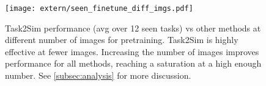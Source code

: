 \begin{figure}[]
    \centering
    \centering
    \texttt{[image: extern/seen\_finetune\_diff\_imgs.pdf]}
    \vspace{-4mm}
    \caption{Task2Sim performance (avg over 12 seen tasks) vs other methods at different number of images for pretraining. Task2Sim is highly effective at fewer images. Increasing the number of images improves performance for all methods, reaching a saturation at a high enough number. See \cref{subsec:analysis} for more discussion.}
    \label{fig:diff_num_imgs}
    \vspace{-2mm}
\end{figure}